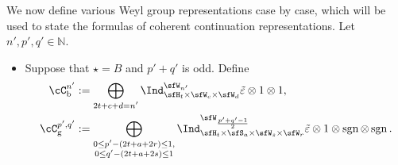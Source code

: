 \documentclass[12pt,a4paper]{amsart}
\newcommand{\BN}{{\mathbb {N}}}
\newcommand{\sgn}{\operatorname{sgn}}
\numberwithin{equation}{section}
\theoremstyle{remark}
\def\brsgn{\breve{\sgn}}
\begin{document}
We now define various Weyl group representations case by case, which will be used to
state the formulas of coherent continuation representations. Let $n', p', q'\in \BN$.
\begin{itemize}
  \item Suppose that $\star= B$ and $p'+q'$ is odd. Define
        \[
        \begin{split}
          \cC_{\mathrm b}^{n'} & :=\bigoplus_{\substack{2t+c+d=n'}} \Ind_{\sfH_{t} \times \sfW_{c}\times \sfW_{d}}^{\sfW_{n'}}
         \tilde{\varepsilon}\otimes 1\otimes 1,\\
                   \cC_{\mathrm g}^{p',q'}& :=\bigoplus_{\substack{0\leq p'-(2t+a+2r)\leq 1,\\0\leq q' - (2t+a+2s)\leq 1}} \Ind_{\sfH_{t} \times \sfS_{a}\times \sfW_s\times \sfW_r}^{\sfW_{\frac{p'+q'-1}{2}}}
         \tilde{\varepsilon} \otimes 1 \otimes \sgn \otimes \sgn. \\
          \end{split}
        \]




\end{itemize}
\end{document}
